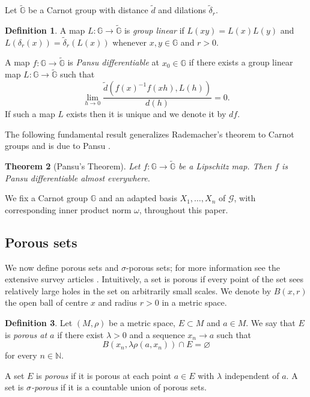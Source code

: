 \documentclass[reqno, 11pt]{amsart}
\newtheorem{theorem}{Theorem}
\theoremstyle{definition}
\newtheorem{definition}[theorem]{Definition}
\theoremstyle{remark}
\numberwithin{theorem}{section}
\numberwithin{equation}{section}
\begin{document}
Let $\widetilde{\mathbb{G}}$ be a Carnot group with distance $\widetilde{d}$ and dilations $\widetilde{\delta}_r$. 

\begin{definition}
A map $L\colon \mathbb{G}\to \widetilde{\mathbb{G}}$ is \emph{group linear} if $L(xy)=L(x)L(y)$ and $L(\delta_{r}(x))=\widetilde{\delta}_r(L(x))$ whenever $x, y\in \mathbb{G}$ and $r>0$.

A map $f\colon \mathbb{G}\to \widetilde{\mathbb{G}}$ is \emph{Pansu differentiable} at $x_0\in \mathbb{G}$ if
there exists a group linear map $L\colon \mathbb{G}\to \widetilde{\mathbb{G}}$ such that
\[ \lim_{h\to 0} \frac{\widetilde{d}(f(x)^{-1}f(xh), L(h))}{d(h)}= 0.\]
If such a map $L$ exists then it is unique and we denote it by $df$.
\end{definition}

The following fundamental result generalizes Rademacher's theorem to Carnot groups and is due to Pansu \cite{PP}.

\begin{theorem}[Pansu's Theorem]\label{PansuThm}
Let $f\colon \mathbb{G}\to \widetilde{\mathbb{G}}$ be a Lipschitz map. Then $f$ is Pansu differentiable almost everywhere.
\end{theorem}

We fix a Carnot group $\mathbb{G}$ and an adapted basis $X_1,\ldots, X_n$ of $\mathcal{G}$, with corresponding inner product norm $\omega$, throughout this paper.

\subsection{Porous sets}

We now define porous sets and $\sigma$-porous sets; for more information see the extensive survey articles \cite{Zaj87, Zaj05}. Intuitively, a set is porous if every point of the set sees relatively large holes in the set on arbitrarily small scales. We denote by $B(x,r)$ the open ball of centre $x$ and radius $r>0$ in a metric space.

\begin{definition}\label{def_porous}
Let $(M, \rho)$ be a metric space, $E\subset M$ and $a\in M$. We say that  $E$ is \emph{porous at $a$} if there exist $\lambda>0$ and a sequence $x_{n}\to a$ such that
\[B(x_n,\lambda \rho(a,x_n))\cap E=\varnothing\]
for every $n\in \mathbb{N}$. 

A set $E$ is \emph{porous} if it is porous at each point $a\in E$ with $\lambda$ independent of $a$. A set is \emph{$\sigma$-porous} if it is a countable union of porous sets. 
\end{definition}
\end{document}
